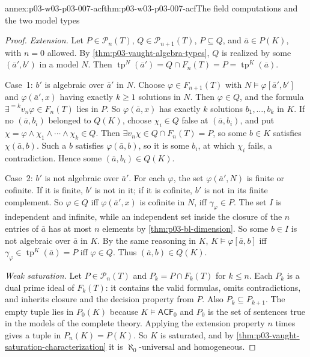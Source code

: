 \begin{annexitem}{annex:p03-w03-p03-007-acf}{thm:p03-w03-p03-007-acf}{The field computations and the two model types}
\begin{proof}
\emph{Extension.} Let \(P\in\mathcal P_n(T)\), \(Q\in\mathcal P_{n+1}(T)\),
\(P\subseteq Q\), and \(\bar a\in P(K)\), with \(n=0\) allowed. By
\cref{thm:p03-vaught-algebra-types}, \(Q\) is realized by some
\((\bar a',b')\) in a model \(N\). Then
\(\operatorname{tp}^N(\bar a')=Q\cap F_n(T)=P=\operatorname{tp}^K(\bar a)\).

Case~1: \(b'\) is algebraic over \(\bar a'\) in \(N\). Choose
\(\varphi\in F_{n+1}(T)\) with \(N\models\varphi[\bar a',b']\) and
\(\varphi(\bar a',x)\) having exactly \(k\ge1\) solutions in \(N\). Then
\(\varphi\in Q\), and the formula
\(\exists^{=k}v_n\varphi\in F_n(T)\) lies in \(P\). So \(\varphi(\bar a,x)\) has
exactly \(k\) solutions \(b_1,\ldots,b_k\) in \(K\). If no \((\bar a,b_i)\)
belonged to \(Q(K)\), choose \(\chi_i\in Q\) false at \((\bar a,b_i)\), and
put \(\chi=\varphi\land\chi_1\land\cdots\land\chi_k\in Q\). Then
\(\exists v_n\chi\in Q\cap F_n(T)=P\), so some \(b\in K\) satisfies
\(\chi(\bar a,b)\). Such a \(b\) satisfies \(\varphi(\bar a,b)\), so it is
some \(b_i\), at which \(\chi_i\) fails, a contradiction. Hence some
\((\bar a,b_i)\in Q(K)\).

Case~2: \(b'\) is not algebraic over \(\bar a'\). For each \(\varphi\), the
set \(\varphi(\bar a',N)\) is finite or cofinite. If it is finite, \(b'\) is
not in it; if it is cofinite, \(b'\) is not in its finite complement. So
\(\varphi\in Q\) iff \(\varphi(\bar a',x)\) is cofinite in \(N\), iff
\(\gamma_\varphi\in P\). The set \(I\) is independent and infinite, while an
independent set inside the closure of the \(n\) entries of \(\bar a\) has at
most \(n\) elements by \cref{thm:p03-bl-dimension}. So some \(b\in I\) is
not algebraic over \(\bar a\) in \(K\). By the same reasoning in \(K\),
\(K\models\varphi[\bar a,b]\) iff \(\gamma_\varphi\in\operatorname{tp}^K(\bar a)=P\)
iff \(\varphi\in Q\). Thus \((\bar a,b)\in Q(K)\).

\emph{Weak saturation.} Let \(P\in\mathcal P_n(T)\) and
\(P_k=P\cap F_k(T)\) for \(k\le n\). Each \(P_k\) is a dual prime ideal of
\(F_k(T)\): it contains the valid formulas, omits contradictions, and
inherits closure and the decision property from \(P\). Also
\(P_k\subseteq P_{k+1}\). The empty tuple lies in \(P_0(K)\) because
\(K\models\mathsf{ACF}_0\) and \(P_0\) is the set of sentences true in the
models of the complete theory. Applying the extension property \(n\) times
gives a tuple in \(P_n(K)=P(K)\). So \(K\) is saturated, and by
\cref{thm:p03-vaught-saturation-characterization} it is
\(\aleph_0\)-universal and homogeneous.


\end{proof}
\end{annexitem}
